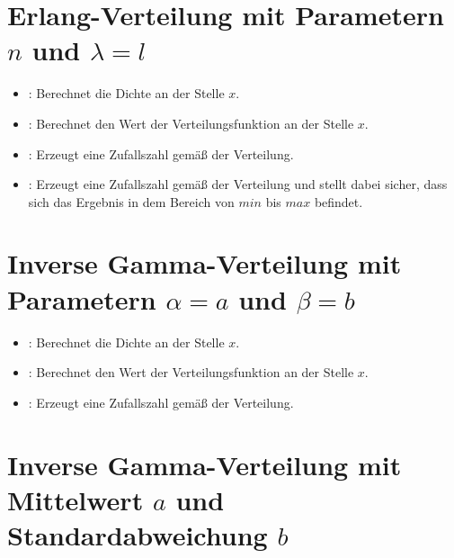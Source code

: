\section{Erlang-Verteilung mit Parametern \texorpdfstring{$n$}{n} und \texorpdfstring{$\lambda=l$}{l}}

\begin{itemize}

\item
{}:
Berechnet die Dichte an der Stelle $x$.

\item
{}:
Berechnet den Wert der Verteilungsfunktion an der Stelle $x$.

\item
{}:
Erzeugt eine Zufallszahl gemäß der Verteilung.

\item
{}:
Erzeugt eine Zufallszahl gemäß der Verteilung und stellt dabei sicher, dass sich das Ergebnis in dem Bereich von $min$ bis $max$ befindet.

\end{itemize}



\section{Inverse Gamma-Verteilung mit Parametern \texorpdfstring{$\alpha=a$}{a} und \texorpdfstring{$\beta=b$}{b}}

\begin{itemize}

\item
{}:
Berechnet die Dichte an der Stelle $x$.

\item
{}:
Berechnet den Wert der Verteilungsfunktion an der Stelle $x$.

\item
{}:
Erzeugt eine Zufallszahl gemäß der Verteilung.

\end{itemize}



\section{Inverse Gamma-Verteilung mit Mittelwert \texorpdfstring{$a$}{a} und Standardabweichung \texorpdfstring{$b$}{b}}

